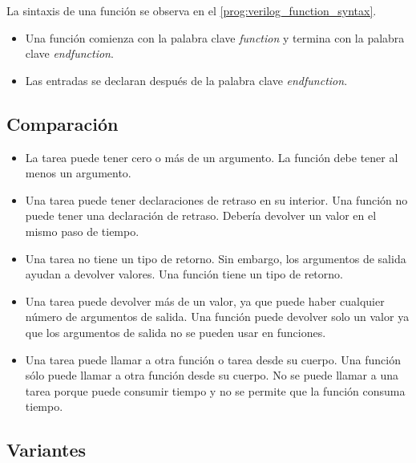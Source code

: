 

La sintaxis de una función se observa en el \autoref{prog:verilog_function_syntax}.

\begin{itemize}
	\item Una función comienza con la palabra clave \textit{function} y termina con la palabra clave \textit{endfunction}.
	\item Las entradas se declaran después de la palabra clave \textit{endfunction}. \cite{asic_2014} 
\end{itemize}



\subsection{Comparación}

\begin{itemize}
	\item La tarea puede tener cero o más de un argumento. La función debe tener al menos un argumento. 
	\item Una tarea puede tener declaraciones de retraso en su interior. Una función no puede tener una declaración de retraso. Debería devolver un valor en el mismo paso de tiempo.
	\item Una tarea no tiene un tipo de retorno. Sin embargo, los argumentos de salida ayudan a devolver valores. Una función tiene un tipo de retorno.
	\item Una tarea puede devolver más de un valor, ya que puede haber cualquier número de argumentos de salida. Una función puede devolver solo un valor ya que los argumentos de salida no se pueden usar en funciones.
	\item Una tarea puede llamar a otra función o tarea desde su cuerpo. Una función sólo puede llamar a otra función desde su cuerpo. No se puede llamar a una tarea porque puede consumir tiempo y no se permite que la función consuma tiempo.
\end{itemize}

\subsection{Variantes}

